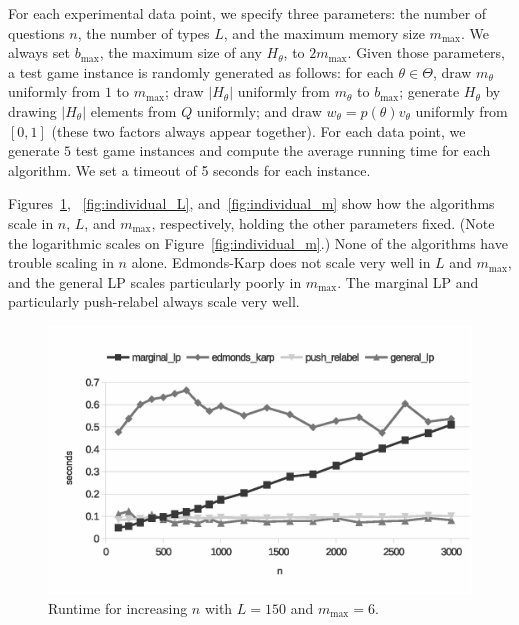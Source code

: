 \documentclass{article}
\begin{document}
For each experimental data point, we specify three parameters:
the number of questions $n$, the number of types $L$, and the maximum
memory size $m_{\text{max}}$.  We always set $b_\text{max}$, the maximum
size of any $H_\theta$, to $2m_{\text{max}}$.
Given those
parameters, a test game instance is randomly generated as follows: for each
$\theta \in \Theta$, draw $m_\theta$ uniformly from $1$ to $m_{\text{max}}$; draw $|H_\theta|$
uniformly from $m_\theta$ to $b_{\text{max}}$;
generate $H_\theta$ by drawing $|H_\theta|$
elements from $Q$ uniformly; and draw $w_\theta = p(\theta)v_\theta$ 
uniformly 
from $[0,1]$ (these two factors always appear together).
For each data point,
we generate $5$ test game instances and compute the average running time
for each algorithm.  We set a timeout of 5 seconds for each instance.




Figures~\ref{fig:individual_n},~ \ref{fig:individual_L},
and~\ref{fig:individual_m}  show how the algorithms scale in $n$, $L$, and
$m_\text{max}$, respectively, holding the other parameters fixed.  
(Note the logarithmic scales on Figure~\ref{fig:individual_m}.)
None of the algorithms have trouble scaling in $n$ alone.
 Edmonds-Karp does not scale very well in $L$ and
$m_\text{max}$, and the general LP scales particularly poorly in
$m_\text{max}$.
The marginal LP and particularly push-relabel always scale very well.
\begin{figure}
	\caption{Runtime for increasing $n$
with 
$L = 150$ and $m_{\text{max}} = 6$.}\label{fig:individual_n}
	\includegraphics[trim=0 20mm 0 0, clip, width=\linewidth]{individual_n}
\end{figure}
\end{document}
